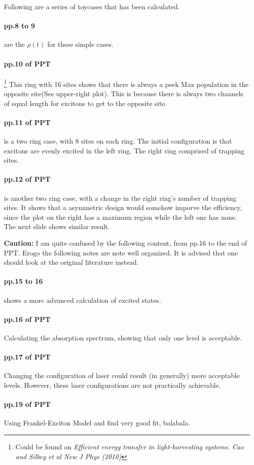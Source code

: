 \documentclass{article}
\numberwithin{equation}{subsection} %
\theoremstyle{definition}
\begin{document}
Following are a series of toycases that has been calculated.

\paragraph{pp.8 to 9} are the $\rho(t)$ for these simple cases.

\paragraph{pp.10 of PPT}
\footnote{Could be found on \textit{Efficient energy transfer in 
light-harvesting systems. Cao and Silbey et al New J Phys (2010)}}
This ring with 16 sites shows that there is always 
a peek Max population in the opposite site(See upper-right plot). This is
because there is always
two channels of equal length for excitons to get to the opposite site.

\paragraph{pp.11 of PPT} is 
a two ring case, with 8 sites on each ring. The initial configuration
is that excitons are evenly excited in the left ring. 
The right ring comprised of trapping sites.

\paragraph{pp.12 of PPT} is 
another two ring case, with a change in the right ring's number
of trapping sites. It shows that a asymmetric design would somehow
imporve the efficiency, since the plot on the right has a maximum region
while the left one has none. The next slide shows similar result.

\textbf{Caution:} I am quite confused by the following content,
from pp.16 to the end of PPT. Erogo the
following notes are note well organized. It is advised that one should
look at the original literature instead.

\paragraph{pp.15 to 16} shows a more advanced calculation of excited
states.

\paragraph{pp.16 of PPT} Calculating the absorption spectrum, 
showing that only one level is acceptable.

\paragraph{pp.17 of PPT}
Changing the configuration of laser could result (in generally) more
acceptable levels. However, these laser configurations are not practically
achievable.

\paragraph{pp.19 of PPT}
Using Frankel-Exciton Model and find very good fit, balabala.
\end{document}
